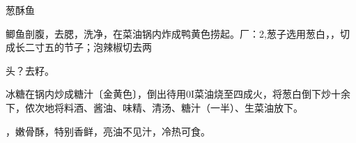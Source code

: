 \begin{recipe}{葱酥鱼}

\ingredients


\cooking

\step 鲫鱼剖腹，去腮，洗净，在菜油锅内炸成鸭黄色捞起。厂：2,葱子选用葱白，，切成长二寸五的节子；泡辣椒切去两

头？去籽。

\step 冰糖在锅内炒成糖汁〔金黄色〕，倒出待用0I菜油烧至四成火，将葱白倒下炒十余下，侬次地将料酒、酱油、味精、清汤、糖汁（一半）、生菜油放下。

\notes

，嫩骨酥，特别香鲜，亮油不见汁，冷热可食。

\end{recipe}

